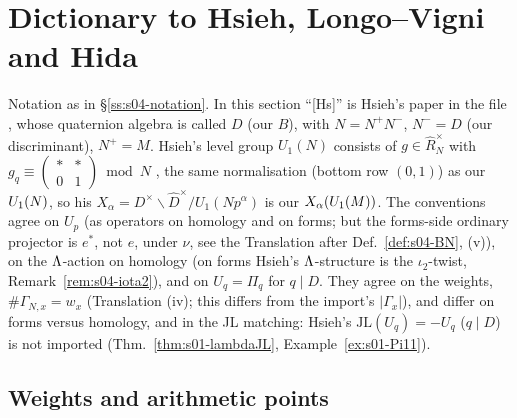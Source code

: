 \section{Dictionary to Hsieh, Longo--Vigni and Hida}

Notation as in \S\ref{ss:s04-notation}. In this section ``[Hs]'' is Hsieh's paper in the file
, whose quaternion algebra is called $D$ (our $B$),
with $N=N^+N^-$, $N^-=D$ (our discriminant), $N^+=M$. Hsieh's level group $U_1(N)$ consists of $g\in\hat R_N^\times$ with
$g_q\equiv\left(\begin{smallmatrix}*&*\\0&1\end{smallmatrix}\right)\bmod N$ ,
the same normalisation (bottom row $(0,1)$) as our $U_1(N)$, so his $X_\alpha=D^\times\backslash\hat D^\times/U_1(Np^\alpha)$ is our
$X_\alpha(U_1(M))$. The conventions agree on $U_p$ (as operators on homology and on forms; but the forms-side ordinary projector is $e^*$, not $e$, under
$\nu$, see the Translation after Def.~\ref{def:s04-BN}, (v)), on the $\Lambda$-action on homology (on forms Hsieh's $\Lambda$-structure is the
$\iota_2$-twist, Remark~\ref{rem:s04-iota2}), and on $U_q=\Pi_q$ for $q\mid D$. They agree on the weights, $\#\Gamma_{N,x}=w_x$ (Translation (iv); this differs from the
import's $|\Gamma_x|$), and differ on forms versus homology, and in the JL matching: Hsieh's $\mathrm{JL}(U_q)=-U_q$ ($q\mid D$) is not imported (Thm.~\ref{thm:s01-lambdaJL},
Example~\ref{ex:s01-Pi11}).

\subsection{Weights and arithmetic points}

